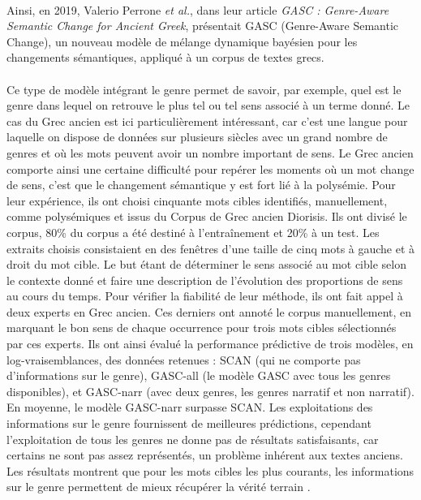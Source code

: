 \documentclass{article}
\begin{document}
\paragraph{}
Ainsi, en 2019, Valerio Perrone \textit{et al.}, dans leur article \textit{GASC : Genre-Aware Semantic Change for Ancient Greek}, présentait GASC (Genre-Aware Semantic Change), un nouveau modèle de mélange dynamique bayésien pour les changements sémantiques, appliqué à un corpus de textes grecs.  
\paragraph{}
Ce type de modèle intégrant le genre permet de savoir, par exemple, quel est le genre dans lequel on retrouve le plus tel ou tel sens associé à un terme donné. Le cas du Grec ancien est ici particulièrement intéressant, car c’est une langue pour laquelle on dispose de données sur plusieurs siècles avec un grand nombre de genres et où les mots peuvent avoir un nombre important de sens. Le Grec ancien comporte ainsi une certaine difficulté pour repérer les moments où un mot change de sens, c’est que le changement sémantique y est fort lié à la polysémie. Pour leur expérience, ils ont choisi cinquante mots cibles identifiés, manuellement, comme polysémiques et issus du Corpus de Grec ancien Diorisis. Ils ont divisé le corpus, 80\% du corpus a été destiné à l’entraînement et 20\% à un test. Les extraits choisis consistaient en des fenêtres d’une taille de cinq mots à gauche et à droit du mot cible. Le but étant de déterminer le sens associé au mot cible selon le contexte donné et faire une description de l’évolution des proportions de sens au cours du temps. Pour vérifier la fiabilité de leur méthode, ils ont fait appel à deux experts en Grec ancien. Ces derniers ont annoté le corpus manuellement, en marquant le bon sens de chaque occurrence pour trois mots cibles sélectionnés par ces experts. Ils ont ainsi évalué la performance prédictive de trois modèles, en log-vraisemblances, des données retenues : SCAN (qui ne comporte pas d’informations sur le genre), GASC-all (le modèle GASC avec tous les genres disponibles), et GASC-narr (avec deux genres, les genres narratif et non narratif). En moyenne, le modèle GASC-narr surpasse SCAN. Les exploitations des informations sur le genre fournissent de meilleures prédictions, cependant l’exploitation de tous les genres ne donne pas de résultats satisfaisants, car certains ne sont pas assez représentés, un problème inhérent aux textes anciens. Les résultats montrent que pour les mots cibles les plus courants, les informations sur le genre permettent de mieux récupérer la vérité terrain \cite{perrone2019gasc}. 
\end{document}
